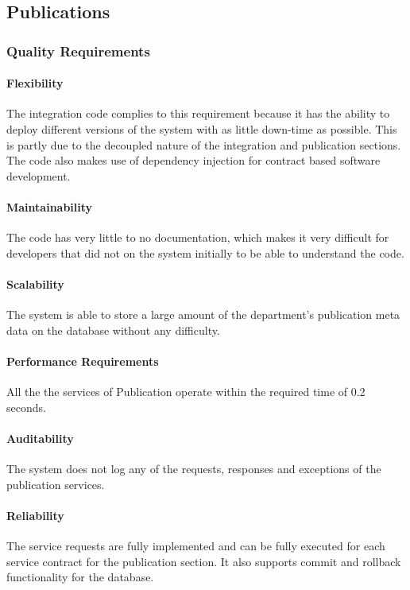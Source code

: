 \documentclass{article}
\begin{document}
    \subsection{Publications}
    	\subsubsection{Quality Requirements}
    		\paragraph{Flexibility}
            The integration code complies to this requirement because it has the ability to deploy different versions of the system with as little down-time as possible. This is partly due to the decoupled nature of the integration and publication sections. The code also makes use of dependency injection for contract based software development.
    
            \paragraph{Maintainability}
            The code has very little to no documentation, which makes it very difficult for developers that did not on the system initially to be able to understand the code.
            
            \paragraph{Scalability}
            The system is able to store a large amount of the department's publication meta data on the database without any difficulty.
            
            \paragraph{Performance Requirements}
            All the the services of Publication operate within the required time of 0.2 seconds.
            
            \paragraph{Auditability}
            The system does not log any of the requests, responses and exceptions of the publication services.
            
            
            \paragraph{Reliability}
            The service requests are fully implemented and can be fully executed for each service contract for the publication section. It also supports commit and rollback functionality for the database.
            
\end{document}
